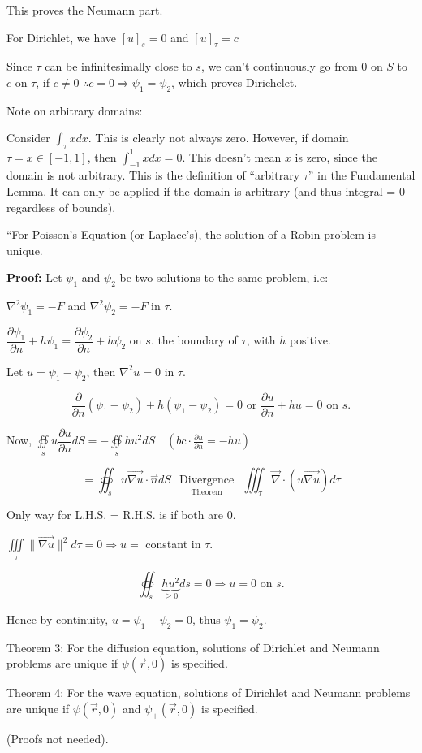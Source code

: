 \documentclass{report}
\begin{document}
This proves the Neumann part.

For Dirichlet, we have $[u]_{s}=0$ and $[u]_{\tau}=c$

Since $\tau$ can be infinitesimally close to $s$, we can't continuously go from 0 on $S$ to $c$ on $\tau$, if $c \neq 0$ $\therefore c=0 \Rightarrow \psi_{1}=\psi_{2}$, which proves Dirichelet.

Note on arbitrary domains:

Consider $\displaystyle\int_{\tau} x d x$. This is clearly not always zero. However, if domain $\tau=x \in[-1,1]$, then $\displaystyle\int_{-1}^{1} x d x=0$. This doesn't mean $x$ is zero, since the domain is not arbitrary. This is the definition of ``arbitrary $\tau$'' in the Fundamental Lemma. It can only be applied if the domain is arbitrary (and thus integral = 0 regardless of bounds).

``For Poisson's Equation (or Laplace's), the solution of a Robin problem is unique.

\textbf{Proof:} Let $\psi_{1}$ and $\psi_{2}$ be two solutions to the same problem, i.e:

$\nabla^{2} \psi_{1}=-F$ and $\nabla^{2} \psi_{2}=-F$ in $\tau$.

$\dfrac{\partial \psi_{1}}{\partial n}+h \psi_{1}=\dfrac{\partial \psi_{2}}{\partial n}+h \psi_{2}$ on $s$. the boundary of $\tau$, with $h$ positive.

Let $u=\psi_{1}-\psi_{2}$, then $\nabla^{2} u=0$ in $\tau$.

$$
\dfrac{\partial}{\partial n}\left(\psi_{1}-\psi_{2}\right)+h\left(\psi_{1}-\psi_{2}\right)=0 \text { or } \frac{\partial u}{\partial n}+h u=0 \text { on } s .
$$

Now, $\oiint\limits_{s} u \dfrac{\partial u}{\partial n} d S=-\oiint\limits_{s} h u^{2} d S \quad\left(b c \cdot \frac{\partial u}{\partial n}=-h u\right)$

$$
=\oiint_{s} u \overrightarrow{\nabla u} \cdot \stackrel{\rightharpoonup}{n} d S \underset{\text { Theorem }}{\substack{\text { Divergence }}} \iiint_{\tau} \vec{\nabla} \cdot(u \overrightarrow{\nabla u}) d \tau
$$

Only way for L.H.S. = R.H.S. is if both are $0$.

$\iiint\limits_{\tau}\|\overrightarrow{\nabla u}\|^{2} d \tau=0 \Rightarrow u=$ constant in $\tau$.

$$
\oiint_{s} \underbrace{h u^{2}}_{\geqslant 0} d s=0 \Rightarrow u=0 \text { on } s.
$$

Hence by continuity, $u=\psi_{1}-\psi_{2}=0$, thus $\psi_{1}=\psi_{2}$.

Theorem 3: For the diffusion equation, solutions of Dirichlet and Neumann problems are unique if $\psi(\vec{r}, 0)$ is specified.

Theorem 4: For the wave equation, solutions of Dirichlet and Neumann problems are unique if $\psi(\vec{r}, 0)$ and $\psi_{+}(\vec{r}, 0)$ is specified.

(Proofs not needed).
\end{document}

